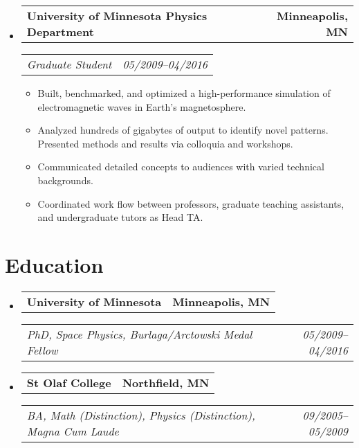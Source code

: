 \documentclass[11pt,letterpaper]{article}
\makeatletter
\newcommand{\headerrow}[2]{
    \begin{tabular*}{\linewidth}{l@{ \extracolsep{\fill} }r} #1 & #2
    \end{tabular*}
}
\newcommand{\YearRange}[2]{#1--#2}
\newcommand{\ResumeSection}[1]{
    \section*{ {\color{MidnightBlue}#1 \sout{\hfill} } }
}
\makeatother
\begin{document}
\begin{itemize}[leftmargin=\parindent]
    \item[]
        \headerrow
            { \textbf{University of Minnesota Physics Department} }
            { \textbf{Minneapolis, MN} }
        \headerrow
            { \emph{Graduate Student} }
            { \emph{ \YearRange{05/2009}{04/2016} } }
        \begin{itemize}
            \item Built, benchmarked, and optimized a high-performance simulation of electromagnetic waves in Earth's magnetosphere.
            \item Analyzed hundreds of gigabytes of output to identify novel patterns. Presented methods and results via colloquia and workshops.
            \item Communicated detailed concepts to audiences with varied technical backgrounds.
            \item Coordinated work flow between professors, graduate teaching assistants, and undergraduate tutors as Head TA.
        \end{itemize}

\end{itemize}


\ResumeSection{Education}

\begin{itemize}[leftmargin=\parindent]
    \parskip=0.1em

    \item[]
        \headerrow
            { \textbf{University of Minnesota} }
            { \textbf{Minneapolis, MN} }
        \headerrow
            { \emph{PhD, Space Physics, Burlaga/Arctowski Medal Fellow} }
            { \emph{ \YearRange{05/2009}{04/2016} } }

    \item[]
        \headerrow
            { \textbf{St Olaf College} }
            { \textbf{Northfield, MN} }
        \headerrow
            { \emph{BA, Math (Distinction), Physics (Distinction),
                 Magna Cum Laude} }
            { \emph{ \YearRange{09/2005}{05/2009} } }

\end{itemize}

\end{document}
